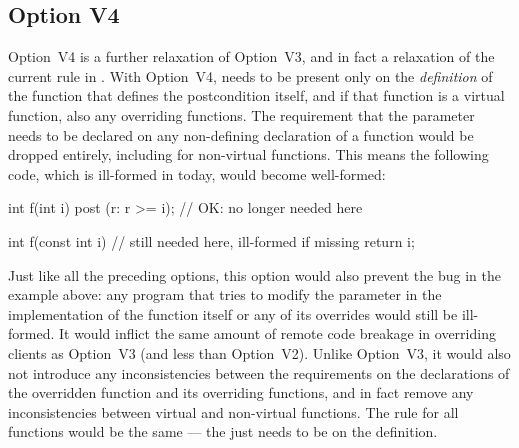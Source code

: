 \subsection*{Option V4}

Option~V4 is a further relaxation of Option~V3, and in fact a relaxation of the current rule in \cite{P2900R10}. With Option~V4,  needs to be present only on the \emph{definition} of the function that defines the postcondition itself, and if that function is a virtual function, also any overriding functions. The requirement that the parameter needs to be declared  on any non-defining declaration of a function would be dropped entirely, including for non-virtual functions. This means the following code, which is ill-formed in \cite{P2900R10} today, would become well-formed:

\begin{codeblock}
int f(int i) post (r: r >=  i);  // OK:  no longer needed here

int f(const int i) {  //  still needed here, ill-formed if missing
  return i;
}
\end{codeblock}
Just like all the preceding options, this option would also prevent the bug in the example above: any program that tries to modify the parameter in the implementation of the function itself or any of its overrides would still be ill-formed. It would inflict the same amount of remote code breakage in overriding clients as Option~V3 (and less than Option~V2). Unlike Option~V3, it would also not introduce any inconsistencies between the requirements on the declarations of the overridden function and its overriding functions, and in fact remove any inconsistencies between virtual and non-virtual functions. The rule for all functions would be the same --- the  just needs to be on the definition.


